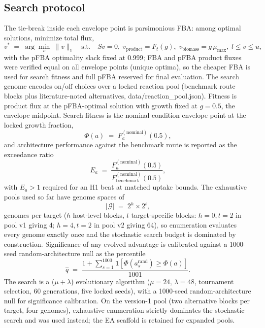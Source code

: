 \documentclass[12pt,a4paper]{article}
\begin{document}
\subsection{Search protocol}
The tie-break inside each envelope point is parsimonious FBA: among optimal solutions, minimize total flux,
\begin{equation}
v^{*} \;=\; \arg\min_{v} \; \|v\|_{1} \quad \text{s.t.} \quad S v = 0, \; v_{\text{product}} = F_t(g), \; v_{\text{biomass}} = g\,\mu_{\max}, \; l \le v \le u,
\end{equation}
with the pFBA optimality slack fixed at 0.999; FBA and pFBA product fluxes were verified equal on all envelope points (unique optima), so the cheaper FBA is used for search fitness and full pFBA reserved for final evaluation.
The search genome encodes on/off choices over a locked reaction pool (benchmark route blocks plus literature-noted alternatives, data/reaction\_pool.json). Fitness is product flux at the pFBA-optimal solution with growth fixed at $g=0.5$, the envelope midpoint. Search fitness is the nominal-condition envelope point at the locked growth fraction,
\begin{equation}
\Phi(a) \;=\; F_a^{(\mathrm{nominal})}(0.5),
\end{equation}
and architecture performance against the benchmark route is reported as the exceedance ratio
\begin{equation}
E_a \;=\; \frac{F_a^{(\mathrm{nominal})}(0.5)}{F_{\mathrm{benchmark}}^{(\mathrm{nominal})}(0.5)},
\end{equation}
with $E_a > 1$ required for an H1 beat at matched uptake bounds. The exhaustive pools used so far have genome spaces of
\begin{equation}
|\mathcal{G}| \;=\; 2^{h} \times 2^{t},
\end{equation}
genomes per target ($h$ host-level blocks, $t$ target-specific blocks: $h{=}0, t{=}2$ in pool v1 giving 4; $h{=}4, t{=}2$ in pool v2 giving 64), so enumeration evaluates every genome exactly once and the stochastic search budget is dominated by construction. Significance of any evolved advantage is calibrated against a 1000-seed random-architecture null as the percentile
\begin{equation}
\hat{q} \;=\; \frac{1 + \sum_{s=1}^{1000} \mathbf{1}[\Phi(a_s^{\mathrm{rand}}) \ge \Phi(a)]}{1001}.
\end{equation}
The search is a ($\mu+\lambda$) evolutionary algorithm ($\mu=24$, $\lambda=48$, tournament selection, 60 generations, five locked seeds), with a 1000-seed random-architecture null for significance calibration. On the version-1 pool (two alternative blocks per target, four genomes), exhaustive enumeration strictly dominates the stochastic search and was used instead; the EA scaffold is retained for expanded pools.
\end{document}
